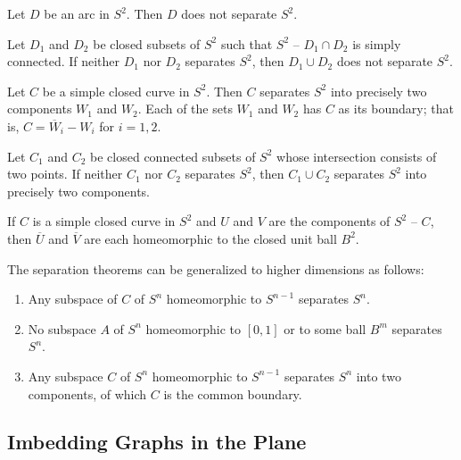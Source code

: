 \begin{theorem}
Let $D$ be an arc in $S^2$. Then $D$ does not separate $S^2$.
\end{theorem}


\begin{theorem}
Let $D_1$ and $D_2$ be closed subsets of $S^2$ such that $S^2 \text{ -- } D_1 \cap D_2$ is simply connected. 
If neither $D_1$ nor $D_2$ separates $S^2$, then $D_1 \cup D_2$ does not separate $S^2$.
\end{theorem}


\begin{theorem}
Let $C$ be a simple closed curve in $S^2$. Then $C$ separates $S^2$ into precisely two components $W_1$ and $W_2$. Each of the sets
$W_1$ and $W_2$ has $C$ as its boundary; that is, $C = \overline{W}_i - W_i$ for $i = 1, 2$.  
\end{theorem}

\begin{theorem}
Let $C_1$ and $C_2$ be closed connected subsets of $S^2$ whose intersection consists of two points. If neither $C_1$ nor $C_2$ separates $S^2$,
then $C_1 \cup C_2$ separates $S^2$ into precisely two components.
\end{theorem}

\begin{theorem}
If $C$ is a simple closed curve in $S^2$ and $U$ and $V$ are the components of $S^2 \text{ -- } C$, then $\overline{U}$ and $\overline{V}$
are each homeomorphic to the closed unit ball $B^2$. 
\end{theorem}

\begin{remark}
The separation theorems can be generalized to higher dimensions as follows:
\begin{enumerate}
    \item Any subspace of $C$ of $S^n$ homeomorphic to $S^{n-1}$ separates $S^n$.
    \item No subspace $A$ of $S^n$ homeomorphic to $[0, 1]$ or to some ball $B^m$ separates $S^n$.
    \item Any subspace $C$ of $S^n$ homeomorphic to $S^{n-1}$ separates $S^n$ into two components, of which $C$ is the common boundary.
\end{enumerate}
\end{remark}

\subsection{Imbedding Graphs in the Plane}

